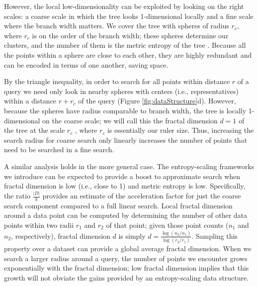 \documentclass[review,preprint,12pt]{elsarticle}
\renewcommand{\cite}{\citep} %
\theoremstyle{definition}
\theoremstyle{remark}
\numberwithin{equation}{section}
\begin{document}
However, the local low-dimensionality can be exploited by looking on the right scales: a coarse scale in which the tree looks 1-dimensional locally and a fine scale where the branch width matters.
We cover the tree with spheres of radius $r_c$, where $r_c$ is on the order of the branch width; these spheres determine our clusters, and the number of them is the metric entropy of the tree \cite{tao2008product}.
Because all the points within a sphere are close to each other, they are highly 
redundant and can be encoded in terms of one another, saving space.

By the triangle inequality, in order to search for all points within distance $r$ of a query we need only look in nearby spheres with centers (i.e., representatives) within a distance $r+r_c$ of the query (Figure \ref{fig:dataStructure}d).
However, because the spheres have radius comparable to branch width, the tree is locally 1-dimensional on the coarse scale; we will call this the fractal dimension $d=1$ of the tree at the scale $r_c$ \cite{falconer1990fractal}, where $r_c$ is essentially our ruler size.
Thus, increasing the search radius for coarse search only linearly increases the number of points that need to be searched in a fine search.

A similar analysis holds in the more general case.
The entropy-scaling frameworks we introduce can be expected to provide a boost to 
approximate search when fractal dimension is low (i.e., close to 1) and metric
entropy is low.
Specifically, the ratio $\frac{|D|}{k}$ provides an estimate of the acceleration factor
for just the coarse search component compared to a full linear search.
Local fractal dimension around a data point can be computed by determining the
number of other data points within two radii $r_1$ and $r_2$ of that point;
given those point counts ($n_1$ and $n_2$, respectively), fractal dimension $d$
is simply $d=\frac{\log (n_2 / n_1)}{ \log (r_2 / r_1)}$.
Sampling this property over a dataset can provide a global average fractal 
dimension.
When we search a larger radius around a query, the number of points we encounter grows exponentially with the fractal dimension;
low fractal dimension implies that this growth will not obviate the gains provided by an entropy-scaling data structure.
\end{document}
